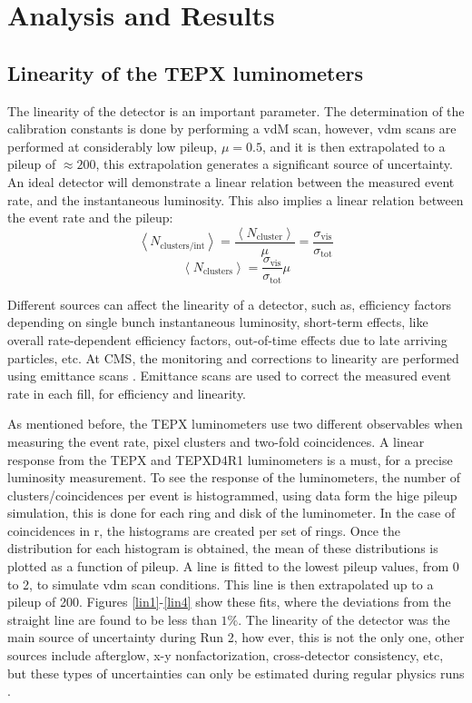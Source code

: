 \chapter{Analysis and Results}
\section{Linearity of the TEPX luminometers}
The linearity of the detector is an important parameter. The determination of the calibration constants is done by performing a vdM scan, however, vdm scans are performed at considerably low pileup, $\mu=0.5$, and it is then extrapolated to a pileup of $\approx 200$, this extrapolation generates a significant source of uncertainty. An ideal detector will demonstrate a linear relation between the measured event rate, and the instantaneous luminosity. This also implies a linear relation between the event rate and the pileup:
\begin{equation}
    \left\langle N_{\text {clusters/int}}\right\rangle=\frac{\left\langle N_{\text {cluster}}\right\rangle}{\mu}=\frac{\sigma_{\text {vis}}}{\sigma_{\text {tot}}}
\end{equation}
\begin{equation}
     \left\langle N_{\text {clusters}}\right\rangle=\frac{\sigma_{\text {vis}}}{\sigma_{\text {tot}}}\mu
\end{equation}

Different sources can affect the linearity of a detector, such as, efficiency factors depending on single bunch instantaneous luminosity, short-term effects, like overall rate-dependent efficiency factors, out-of-time effects due to late arriving particles, etc. At CMS, the monitoring and corrections to linearity are performed using emittance scans \cite{CMS-PAS-LUM-18-002}. Emittance scans are used to correct the measured event rate in each fill, for efficiency and linearity.

As mentioned before, the TEPX luminometers use two different observables when measuring the event rate, pixel clusters and two-fold coincidences. A linear response from the TEPX and TEPXD4R1 luminometers is a must, for a precise luminosity measurement. To see the response of the luminometers, the number of clusters/coincidences per event is histogrammed, using data form the hige pileup simulation, this is done for each ring and disk of the luminometer. In the case of coincidences in r, the histograms are created per set of rings. Once the distribution for each histogram is obtained, the mean of these distributions is plotted as a function of pileup. A line is fitted to the lowest pileup values, from 0 to 2, to simulate vdm scan conditions. This line is then extrapolated up to a pileup of 200. Figures \ref{lin1}-\ref{lin4} show these fits, where the deviations from the straight line are found to be less than $1\%$. The linearity of the detector was the main source of uncertainty during Run 2, how ever, this is not the only one, other sources include afterglow, x-y nonfactorization, cross-detector consistency, etc, but these types of uncertainties can only be estimated during regular physics runs \cite{CMS-PAS-LUM-18-002}.


